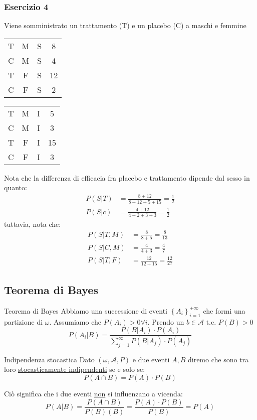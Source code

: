 \subsubsection*{Esercizio 4}
Viene somministrato un trattamento (T) e un placebo (C) a maschi e femmine
\begin{table}[H]
	\centering
	\begin{tabular}{|c c c c|}
		\hline
		T & M & S & 8  \\
		C & M & S & 4  \\
		T & F & S & 12 \\
		C & F & S & 2  \\
		\hline
	\end{tabular}
	\begin{tabular}{|c c c c|}
		\hline
		T & M & I & 5  \\
		C & M & I & 3  \\
		T & F & I & 15 \\
		C & F & I & 3  \\
		\hline
	\end{tabular}
\end{table}
Nota che la differenza di efficacia fra placebo e trattamento dipende dal sesso in quanto:
\begin{align*}
	P\left(S | T\right) & = \frac{8 + 12}{8 + 12 + 5 + 15} = \frac{1}{2} \\
	P\left(S | c\right) & = \frac{4 + 12}{4 + 2 + 3 + 3} = \frac{1}{2}
\end{align*}
tuttavia, nota che:
\begin{align*}
	P\left(S | T, M\right)  & = \frac{ 8}{ 8 + 5}= \frac{8}{13}    \\
	P\left(S | C , M\right) & = \frac{4}{4 + 3} = \frac{4}{7}      \\
	P\left(S | T , F\right) & = \frac{12}{12 + 15} = \frac{12}{27}
\end{align*}
\subsection{Teorema di Bayes}
\begin{teorema}{Teorema di Bayes}
	Abbiamo una successione di eventi $ \left\{ A_i\right\}_{i = 1}^{+ \infty } $ che formi una partizione di $ \omega  $. Assumiamo che $ P\left(A_i\right)> 0 \forall  i $. Prendo un $ b \in \mathcal{A} \text{ t.c. } P\left(B\right)> 0 $
	\[
		P\left(A_i | B\right) = \frac{P\left(B|A_i\right)\cdot P\left(A_i\right)}{\sum_{j=1}^{\infty} P\left(B|A_j\right)\cdot  P \left(A_j\right)}
	\]
\end{teorema}
\begin{definizione}{Indipendenza stocastica}
	Dato $ \left(\omega, \mathcal{A}, P\right) $ e due eventi $ A, B $ diremo che sono tra loro \underline{stocasticamente indipendenti} se e solo se:
	\[
		P\left(A \cap B\right)= P\left(A \right) \cdot P\left(B\right)
	\]
\end{definizione}
Ciò significa che i due eventi \underline{non} si influenzano a vicenda:
\[
	P\left(A|B\right)= \frac{P\left(A \cap  B\right)}{P(B)\left(B\right)} = \frac{P (A) \cdot P\left(B\right) }{P\left(B\right)} = P\left(A\right)
\]
